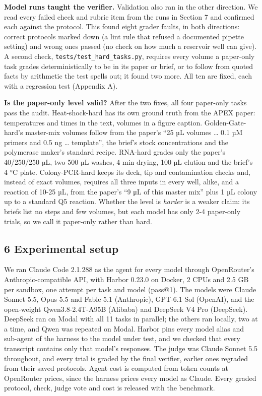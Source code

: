 \documentclass[
]{article}
\begin{document}
\textbf{Model runs taught the verifier.} Validation also ran in the
other direction. We read every failed check and rubric item from the
runs in Section 7 and confirmed each against the protocol. This found
eight grader faults, in both directions: correct protocols marked down
(a lint rule that refused a documented pipette setting) and wrong ones
passed (no check on how much a reservoir well can give). A second check,
\texttt{tests/test\_hard\_tasks.py}, requires every volume a paper-only
task grades deterministically to be in its paper or brief, or to follow
from quoted facts by arithmetic the test spells out; it found two more.
All ten are fixed, each with a regression test (Appendix A).

\textbf{Is the paper-only level valid?} After the two fixes, all four
paper-only tasks pass the audit. Heat-shock-hard has its own ground
truth from the APEX paper: temperatures and times in the text, volumes
in a figure caption. Golden-Gate- hard's master-mix volumes follow from
the paper's ``25 µL volumes \ldots{} 0.1 µM primers and 0.5 ng \ldots{}
template'', the brief's stock concentrations and the polymerase maker's
standard recipe. RNA-hard grades only the paper's 40/250/250 µL, two 500
µL washes, 4 min drying, 100 µL elution and the brief's 4 °C plate.
Colony-PCR-hard keeps its deck, tip and contamination checks and,
instead of exact volumes, requires all three inputs in every well,
alike, and a reaction of 10-25 µL, from the paper's ``9 μL of this
master mix'' plus 1 µL colony up to a standard Q5 reaction. Whether the
level is \emph{harder} is a weaker claim: its briefs list no steps and
few volumes, but each model has only 2-4 paper-only trials, so we call
it paper-only rather than hard.

\subsection{6 Experimental setup}\label{experimental-setup}

We ran Claude Code 2.1.288 as the agent for every model through
OpenRouter's Anthropic-compatible API, with Harbor 0.23.0 on Docker, 2
CPUs and 2.5 GB per sandbox, one attempt per task and model (pass@1).
The models were Claude Sonnet 5.5, Opus 5.5 and Fable 5.1 (Anthropic),
GPT-6.1 Sol (OpenAI), and the open-weight Qwen3.8-2.4T-A95B (Alibaba)
and DeepSeek V4 Pro (DeepSeek). DeepSeek ran on Modal with all 11 tasks
in parallel; the others ran locally, two at a time, and Qwen was
repeated on Modal. Harbor pins every model alias and sub-agent of the
harness to the model under test, and we checked that every transcript
contains only that model's responses. The judge was Claude Sonnet 5.5
throughout, and every trial is graded by the final verifier, earlier
ones regraded from their saved protocols. Agent cost is computed from
token counts at OpenRouter prices, since the harness prices every model
as Claude. Every graded protocol, check, judge vote and cost is released
with the benchmark.
\end{document}

